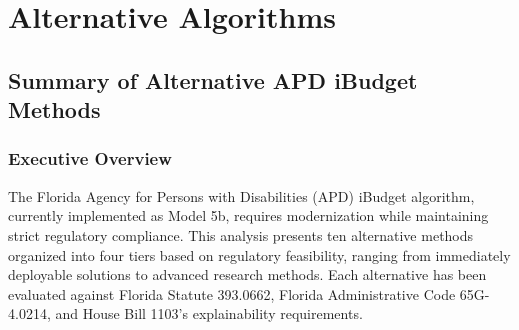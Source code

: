\chapter{Alternative Algorithms}  \newpage





\section{Summary of Alternative APD iBudget Methods}

\subsection{Executive Overview}

The Florida Agency for Persons with Disabilities (APD) iBudget algorithm, currently implemented as Model 5b, requires modernization while maintaining strict regulatory compliance. This analysis presents ten alternative methods organized into four tiers based on regulatory feasibility, ranging from immediately deployable solutions to advanced research methods. Each alternative has been evaluated against Florida Statute 393.0662, Florida Administrative Code 65G-4.0214, and House Bill 1103's explainability requirements.

